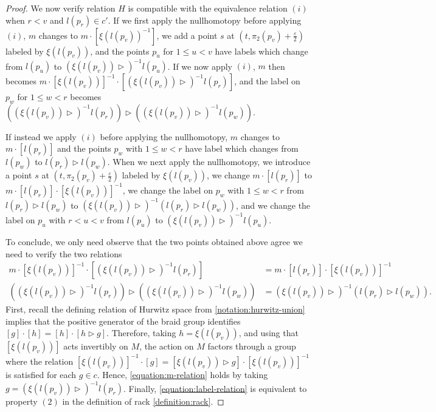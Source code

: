 \documentclass[12 pt]{amsart}
\theoremstyle{plain}
\theoremstyle{definition}
\theoremstyle{remark}
\numberwithin{equation}{section}
\begin{document}
\begin{proof}
	We now verify relation 
	$H$ is compatible with the equivalence relation $(i)$ when $r < v$ and
	$l(p_r) \in c'$.
	If we first apply the nullhomotopy before applying $(i)$, $m$ changes to
	$m \cdot [\xi(l(p_v))^{-1}]$, we add a point $s$ at 
$(t, \pi_2(p_v) + \frac{\varepsilon}{2})$
	labeled by $\xi(l(p_v))$,
	and the points $p_u$ for $1 \leq u < v$ have labels which change from
	$l(p_u)$ to
	$(\xi(l(p_v)) \triangleright )^{-1} l(p_u)$.
	If we now apply $(i)$, $m$ then becomes $m \cdot [\xi(l(p_v))]^{-1} \cdot
	[(\xi(l(p_v))
	\triangleright )^{-1} l(p_r)]$, and 
	the label on $p_w$ for $1 \leq w < r$ becomes $((\xi(l(p_v))
	\triangleright )^{-1} l(p_r)) \triangleright ((\xi(l(p_v))
	\triangleright )^{-1} l(p_w))$.

	If instead we apply $(i)$ before applying the nullhomotopy, $m$ changes
	to $m\cdot [l(p_r)]$ and the points $p_w$ with $1 \leq w < r$ have label
	which changes from $l(p_w)$ to
	$l(p_r) \triangleright l(p_w)$.
	When we next apply the nullhomotopy, 
	we introduce a point $s$ at $(t, \pi_2(p_v) + \frac{\varepsilon}{2})$ labeled by $\xi(l(p_v))$,
	we change $m
	\cdot [l(p_r)]$ to $m \cdot [l(p_r)] \cdot [\xi(l(p_v))]^{-1}$,
	we change the label on 
$p_w$ with $1 \leq w < r$ from $l(p_r) \triangleright l(p_w)$ to
$(\xi(l(p_v)) \triangleright)^{-1} (l(p_r) \triangleright l(p_w))$,
and we change the label on $p_u$ with $r < u < v$ from $l(p_u)$ to
$(\xi(l(p_v)) \triangleright )^{-1} l(p_u)$.

	To conclude, we only need observe that the two points obtained above
	agree we need to verify the two relations
	\begin{align}
		\label{equation:m-relation}
		m \cdot [\xi(l(p_v))]^{-1} \cdot [(\xi(l(p_v))
		\triangleright )^{-1} l(p_r)] &=
		m \cdot [l(p_r)] \cdot [\xi(l(p_v))]^{-1} \\
		\label{equation:label-relation}
		((\xi(l(p_v))
	\triangleright )^{-1} l(p_r)) \triangleright ((\xi(l(p_v))
	\triangleright )^{-1} l(p_w))
	&= (\xi(l(p_v)) \triangleright)^{-1} (l(p_r) \triangleright
	l(p_w)).
	\end{align}
	First, recall the defining relation of Hurwitz space from
	\autoref{notation:hurwitz-union} implies that the positive generator of the
	braid group identifies $[g] \cdot [h] = [h] \cdot [h
	\triangleright g]$. 
	Therefore, taking $h = \xi(l(p_v))$, and using that 
	$[\xi(l(p_v))]$ acts invertibly on $M$, the action on $M$ factors
	through a group where the relation
	$[\xi(l(p_v))]^{-1} \cdot [g]  = [\xi(l(p_v))
	\triangleright g]\cdot [\xi(l(p_v))]^{-1}$
	is satisfied for each $g \in c$.
	Hence, \eqref{equation:m-relation} holds by taking
	$g = (\xi(l(p_v))\triangleright )^{-1} l(p_r)$.
Finally, \eqref{equation:label-relation} is equivalent to property $(2)$ in the
definition of rack \autoref{definition:rack}.
\end{proof}
\end{document}
